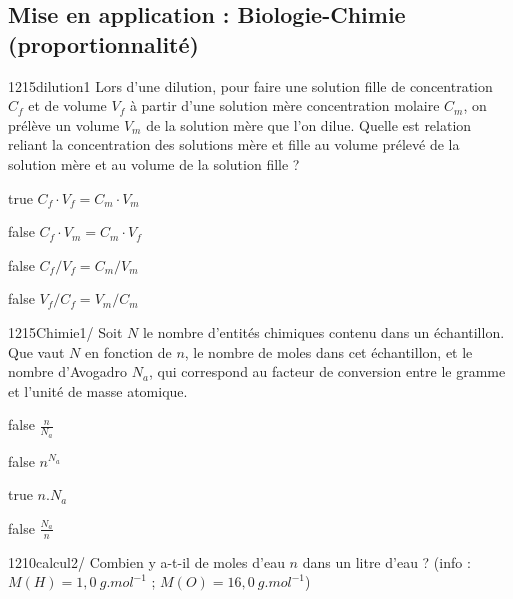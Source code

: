 \documentclass[11pt]{article}
\begin{document}
        \subsection{Mise en application : Biologie-Chimie (proportionnalité)}

            \begin{question}{1215}{dilution}{1}{}
                Lors d'une dilution, pour faire une solution fille de concentration $C_f$ et de volume $V_f$ à partir d'une solution mère concentration molaire $C_m$, on prélève un volume $V_m$ de la solution mère que l'on dilue. Quelle est relation reliant la concentration des solutions mère et fille au volume prélevé de la solution mère et au volume de la solution fille ?
            \end{question}
            \begin{reponses}
                \item[true] $C_f\cdot V_f = C_m\cdot V_m$
                \item[false] $C_f\cdot V_m = C_m\cdot V_f$
                \item[false] $C_f/V_f = C_m/V_m$
        	    \item[false] $V_f/C_f = V_m/C_m$
            \end{reponses}
            
            \begin{question}{1215}{Chimie}{1}{/}
    			 Soit $N$ le nombre d'entités chimiques contenu dans un échantillon. Que vaut $N$ en fonction de  $n$, le nombre de moles dans cet échantillon, et le nombre d'Avogadro $N_a$, qui correspond au facteur de conversion entre le gramme et l'unité de masse atomique. 
            \end{question}

            \begin{reponses}
            	\item[false] $ \frac{n}{N_a} $
            	\item[false] $ n^{N_a}$
                \item[true]  $ n.N_a $
                \item[false] $ \frac{N_a}{n} $
            \end{reponses}
			
		
		    \begin{question}{1210}{calcul}{2}{/}
				  Combien y a-t-il de moles d'eau $n$ dans un litre d'eau ? (info : $M(H) =1,0\ g.mol^{-1}$ ;  $M(O) = 16,0\ g.mol^{-1}$)

            \end{question}
\end{document}
